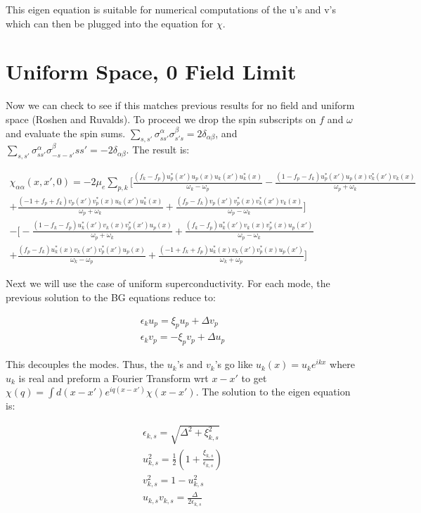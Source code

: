 \documentclass{article}
\begin{document}
This eigen equation is suitable for numerical computations of the u's and v's which can then be plugged into the equation for $\chi$.

\section*{Uniform Space, 0 Field Limit}

Now we can check to see if this matches previous results for no field and uniform space (Roshen and Ruvalds). To proceed we drop the spin subscripts on $f$ and $\omega$ and evaluate the spin sums. $\sum\limits_{s,s'}\sigma^\alpha_{ss'}\sigma^\beta_{s's}=2\delta_{\alpha\beta}$, and $\sum\limits_{s,s'}\sigma^\alpha_{ss'}\sigma^\beta_{-s-s'}ss'=-2\delta_{\alpha\beta}$. The result is:

\begin{align*}
\chi_{\alpha\alpha}(x,x',0)=-2\mu_e\sum\limits_{p,k}\bigg[\frac{(f_{k}-f_{p})u^*_p(x')u_p(x)u_k(x')u^*_k(x)}{\omega_{k}-\omega_{p}}
-\frac{(1-f_{p}-f_{k})u^*_p(x')u_p(x)v^*_k(x')v_k(x)}{\omega_{p}+\omega_{k}} \\
+\frac{(-1+f_{p}+f_{k})v_p(x')v^*_p(x)u_k(x')u^*_k(x)}{\omega_{p}+\omega_{k}} 
+\frac{(f_{p}-f_{k})v_p(x')v^*_p(x)v^*_k(x')v_k(x)}{\omega_{p}-\omega_{k}}\bigg] \\
-\bigg[-\frac{(1-f_{k}-f_{p})u^*_k(x')v_k(x)v^*_p(x')u_p(x)}{\omega_{p}+\omega_{k}}
+\frac{(f_{k}-f_{p})u^*_k(x')v_k(x)v^*_p(x)u_p(x')}{\omega_{p}-\omega_{k}} \\
+\frac{(f_{p}-f_{k})u^*_k(x)v_k(x')v^*_p(x')u_p(x)}{\omega_{k}-\omega_{p}}
+\frac{(-1+f_{k}+f_{p})u^*_k(x)v_k(x')v^*_p(x)u_p(x')}{\omega_{k}+\omega_{p}}\bigg]
\end{align*}

Next we will use the case of uniform superconductivity. For each mode, the previous solution to the BG equations reduce to:

\begin{align*}
\epsilon_k u_p=\xi_p u_p+\Delta v_p \\
\epsilon_k v_p=-\xi_p v_p+\Delta u_p
\end{align*}

This decouples the modes. Thus, the $u_k$'s and $v_k$'s go like $u_k(x)=u_ke^{ikx}$ where $u_k$ is real and preform a Fourier Transform wrt $x-x'$ to get $\chi(q)=\int d(x-x')e^{iq(x-x')} \chi(x-x')$. The solution to the eigen equation is:

\begin{align*}
\epsilon_{k,s}=\sqrt{\Delta^2+\xi_{k,s}^2} \\
u_{k,s}^2=\frac{1}{2}(1+\frac{\xi_{k,s}}{\epsilon_{k,s}}) \\
v_{k,s}^2=1-u_{k,s}^2 \\
u_{k,s}v_{k,s}=\frac{\Delta}{2\epsilon_{k,s}}
\end{align*}
\end{document}
